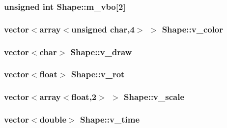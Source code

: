 \hypertarget{classShape_af252a08a695affa2637645dcd4cdf4e9}{
\subsubsection[{m\-\_\-vbo}]{\setlength{\rightskip}{0pt plus 5cm}unsigned int Shape\-::m\-\_\-vbo\mbox{[}2\mbox{]}}}\label{classShape_af252a08a695affa2637645dcd4cdf4e9}
\hypertarget{classShape_af3088673fcd7c8b642df4ecb157e53ff}{
\subsubsection[{v\-\_\-color}]{\setlength{\rightskip}{0pt plus 5cm}vector$<$array$<$unsigned char,4$>$ $>$ Shape\-::v\-\_\-color}}\label{classShape_af3088673fcd7c8b642df4ecb157e53ff}
\hypertarget{classShape_a6f426725f07e290ee150aab7be5b2587}{
\subsubsection[{v\-\_\-draw}]{\setlength{\rightskip}{0pt plus 5cm}vector$<$char$>$ Shape\-::v\-\_\-draw}}\label{classShape_a6f426725f07e290ee150aab7be5b2587}
\hypertarget{classShape_a24f60964f7e4dc1b876a232f94948296}{
\subsubsection[{v\-\_\-rot}]{\setlength{\rightskip}{0pt plus 5cm}vector$<$float$>$ Shape\-::v\-\_\-rot}}\label{classShape_a24f60964f7e4dc1b876a232f94948296}
\hypertarget{classShape_ae2549de1dc4697ef18d2fa01d3e241b9}{
\subsubsection[{v\-\_\-scale}]{\setlength{\rightskip}{0pt plus 5cm}vector$<$array$<$float,2$>$ $>$ Shape\-::v\-\_\-scale}}\label{classShape_ae2549de1dc4697ef18d2fa01d3e241b9}
\hypertarget{classShape_af13b493550d418a20604baf5e1c8a0bd}{
\subsubsection[{v\-\_\-time}]{\setlength{\rightskip}{0pt plus 5cm}vector$<$double$>$ Shape\-::v\-\_\-time}}\label{classShape_af13b493550d418a20604baf5e1c8a0bd}
